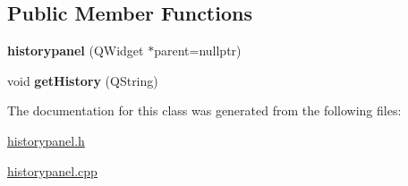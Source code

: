 \subsection*{Public Member Functions}
\begin{DoxyCompactItemize}
\item 
\mbox{\label{classhistorypanel_a59a94361f187f92f34526e865d3e8b63}} 
{\bfseries historypanel} (Q\+Widget $\ast$parent=nullptr)
\item 
\mbox{\label{classhistorypanel_ae0e1b47118a187d381bc40aff467e1d6}} 
void {\bfseries get\+History} (Q\+String)
\end{DoxyCompactItemize}


The documentation for this class was generated from the following files\+:\begin{DoxyCompactItemize}
\item 
\hyperlink{historypanel_8h}{historypanel.\+h}\item 
\hyperlink{historypanel_8cpp}{historypanel.\+cpp}\end{DoxyCompactItemize}
